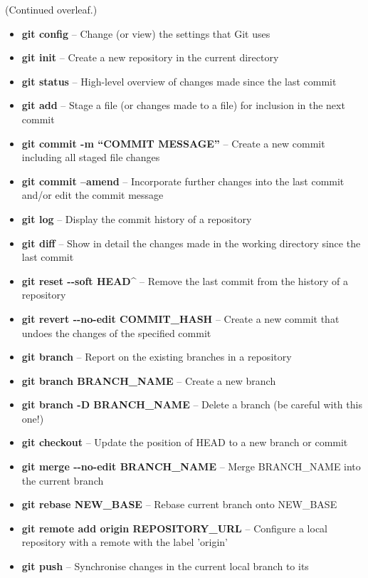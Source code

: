\documentclass[9pt]{extarticle}
\def\itempad{-1pt}
\begin{document}
(Continued overleaf.)

\begin{bluebox}[title=Git Command Cheat Sheet]
  \begin{itemize}
    \itemsep\itempad
  \item \textbf{git config} -- Change (or view) the settings that Git uses
  \item \textbf{git init} -- Create a new repository in the current directory
  \item \textbf{git status} -- High-level overview of changes made since the last commit
  \item \textbf{git add} -- Stage a file (or changes made to a file) for inclusion in
    the next commit
  \item \textbf{git commit -m ``COMMIT MESSAGE''} -- Create a new commit including all
    staged file changes
  \item \textbf{git commit --amend} -- Incorporate further changes into the last commit
    and/or edit the commit message
  \item \textbf{git log} -- Display the commit history of a repository
  \item \textbf{git diff} -- Show in detail the changes made in the working directory
    since the last commit
  \item \textbf{git reset -{}-soft HEAD\^} -- Remove the last commit from the history of
    a repository
  \item \textbf{git revert -{}-no-edit COMMIT\_HASH} -- Create a new commit that undoes
    the changes of the specified commit
  \item \textbf{git branch} -- Report on the existing branches in a repository
  \item \textbf{git branch BRANCH\_NAME} -- Create a new branch
  \item \textbf{git branch -D BRANCH\_NAME} -- Delete a branch (be careful with this one!)
  \item \textbf{git checkout} -- Update the position of HEAD to a new branch or commit
  \item \textbf{git merge -{}-no-edit BRANCH\_NAME} -- Merge BRANCH\_NAME into the
    current branch
  \item \textbf{git rebase NEW\_BASE} -- Rebase current branch onto NEW\_BASE
  \item \textbf{git remote add origin REPOSITORY\_URL} -- Configure a local repository
    with a remote with the label 'origin'
  \item \textbf{git push} -- Synchronise changes in the current local branch to its

\end{itemize}
\end{bluebox}
\end{document}
